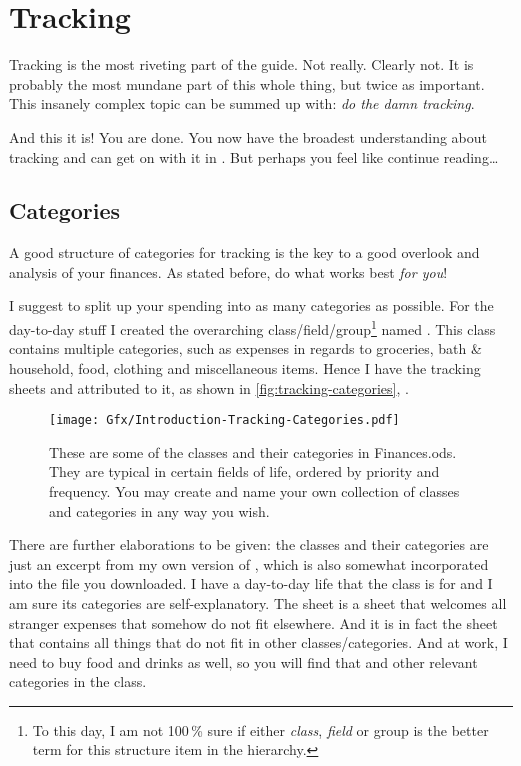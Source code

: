 \section{Tracking}
\label{sec:tracking}

Tracking is the most riveting part of the guide.
Not really.
Clearly not.
It is probably the most mundane part of this whole thing, but twice as important.
This insanely complex topic can be summed up with: \emph{do the damn tracking}.

And this it is!
You are done.
You now have the broadest understanding about tracking and can get on with it in \tfn.
But perhaps you feel like continue reading\ldots

\subsection{Categories}
\label{subsec:tracking-categories}

A good structure of categories for tracking is the key to a good overlook and analysis of your finances.
As stated before, do what works best \emph{for you}!

I suggest to split up your spending into as many categories as possible.
For the day-to-day stuff I created the overarching class/field/group\footnote{To this day, I am not 100\,\% sure if either \emph{class}, \emph{field} or group is the better term for this structure item in the hierarchy.} named .
This class contains multiple categories, such as expenses in regards to groceries, bath \& household, food, clothing and miscellaneous items.
Hence I have the tracking sheets  and  attributed to it, as shown in \autoref{fig:tracking-categories}, .

\begin{figure}[htp]
	\centering
	\texttt{[image: Gfx/Introduction-Tracking-Categories.pdf]}
	\caption[Tracking Categories]{These are some of the classes and their categories in Finances.ods.
	They are typical in certain fields of life, ordered by priority and frequency.
	You may create and name your own collection of classes and categories in any way you wish.%
	}
	\label{fig:tracking-categories}
\end{figure}

There are further elaborations to be given:
the classes and their categories are just an excerpt from my own version of \tfn, which is also somewhat incorporated into the file you downloaded.
I have a day-to-day life that the class  is for and I am sure its categories are self-explanatory.
The sheet  is a sheet that welcomes all stranger expenses that somehow do not fit elsewhere.
And it is in fact the sheet that contains all  things that do not fit in other classes/categories.
And at work, I need to buy food and drinks as well, so you will find that and other relevant categories in the  class.

